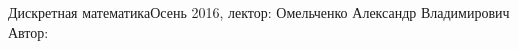 


\BigHeader
	{Дискретная математика}{Осень 2016, лектор: Омельченко Александр Владимирович}
	{Автор: }

